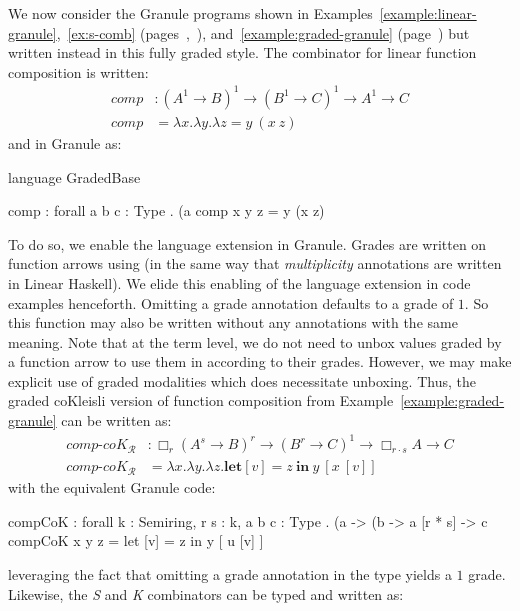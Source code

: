 \begin{example}
We now consider the Granule programs shown in
Examples~\ref{example:linear-granule},~\ref{ex:s-comb} (pages~\pageref{example:linear-granule},~\pageref{k-example}), 
and~\ref{example:graded-granule} (page~\pageref{example:graded-granule}) but written instead in this fully graded style.
The combinator for linear function composition is written: 
\begin{align*}
comp & : (A^1 \rightarrow B)^1 \rightarrow (B^1 \rightarrow C)^1 \rightarrow A^1 \rightarrow C \\
comp & = \lambda x . \lambda y . \lambda z = y\ (x\ z)
\end{align*}
and in Granule as: 
\begin{granule}
language GradedBase 

comp : forall { a b c : Type } . (a %
comp x y z = y (x z)
\end{granule}
To do so, we enable the  language extension in Granule.
Grades are written on function arrows using \granin{\%} (in the same way that
\emph{multiplicity} annotations are written in Linear Haskell). We elide this
enabling of the language extension in code examples henceforth. Omitting a grade
annotation defaults to a grade of $1$. So this function may also be written
without any annotations with the same meaning. Note that at the term level, we
do not need to unbox values graded by a function arrow to use them in according
to their grades. However, we may make explicit use of graded modalities which
does necessitate unboxing. Thus, the graded coKleisli version of function
composition from Example~\ref{example:graded-granule} can be written as:  
\begin{align*}
\textit{comp-}\textit{coK}_{\mathcal{R}} & : \Box_r (A^s \rightarrow B)^r \rightarrow (B^r \rightarrow C)^1 \rightarrow \Box_{r \cdot s} A \rightarrow C \\
\textit{comp-}\textit{coK}_{\mathcal{R}} & = \lambda x . \lambda y . \lambda z . \textbf{let}[v] = z\ \textbf{in}\ y\ [x\ [ v ] ]
\end{align*}
with the equivalent Granule code: 
\begin{granule}
compCoK : forall {k : Semiring, r s : k, a b c : Type} 
     . (a %
     -> (b %
     -> a [r * s] 
     -> c
compCoK x y z = let [v] = z in y  [ u [v] ]
\end{granule}
leveraging the fact that omitting a grade annotation in the type yields a $1$
grade. Likewise, the \emph{S} and \emph{K} combinators can be typed and written as: 

\end{example}
